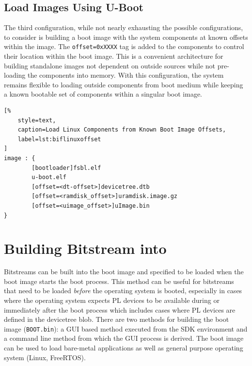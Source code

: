 \subsection{Load Images Using U-Boot}



The third configuration, while not nearly exhausting the possible configurations, to consider is building a boot image with the system components at known offsets within the image. The \texttt{offset=0xXXXX} tag is added to the components to control their location within the boot image. This is a convenient architecture for building standalone images not dependent on outside sources while not pre-loading the components into memory. With this configuration, the system remains flexible to loading outside components from boot medium while keeping a known bootable set of components within a singular boot image. 

\clearpage
\begin{lstlisting}[%
	style=text,
	caption=Load Linux Components from Known Boot Image Offsets,
	label=lst:biflinuxoffset
]
image : {
        [bootloader]fsbl.elf
        u-boot.elf
        [offset=<dt-offset>]devicetree.dtb
        [offset=<ramdisk_offset>]uramdisk.image.gz
        [offset=<uimage_offset>]uImage.bin
}
\end{lstlisting}



\section{Building Bitstream into }

Bitstreams can be built into the boot image and specified to be loaded when the boot image starts the boot process. This method can be useful for bitstreams that need to be loaded \textit{before} the operating system is booted, especially in cases where the operating system expects PL devices to be available during or immediately after the boot process which includes cases where PL devices are defined in the devicetree blob. There are two methods for building the boot image (\texttt{BOOT.bin}): a GUI based method executed from the SDK environment and a command line method from which the GUI process is derived. The boot image can be used to load bare-metal applications as well as general purpose operating system (\eg Linux, FreeRTOS). 


